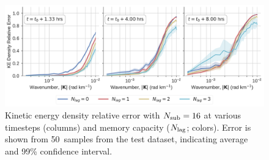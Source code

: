 \begin{figure}
    \centering
    \includegraphics[width=\textwidth]{../figures/nvar_ke_relerr_vs_lag.pdf}
    \caption{Kinetic energy density relative error with $N_\text{sub}=16$ at various
        timesteps (columns) and memory capacity ($N_\text{lag}$; colors).
        Error is shown from 50~samples from the test dataset, indicating average
        and 99\% confidence interval.
    }
    \label{fig:nvar_ke_vs_lag}
\end{figure}
